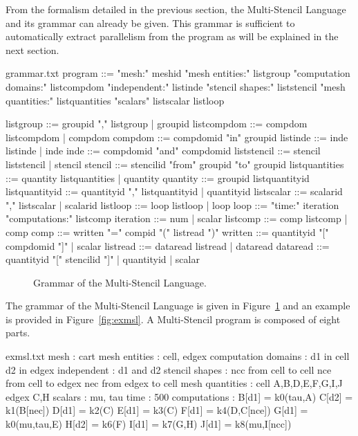From the formalism detailed in the previous section, the Multi-Stencil Language and its grammar can already be given.
This grammar is sufficient to automatically extract parallelism from the program as will be explained in the next section.

\begin{filecontents*}{grammar.txt}
program ::= "mesh:" meshid 
            "mesh entities:" listgroup
            "computation domains:" listcompdom
            "independent:" listinde
            "stencil shapes:" liststencil
            "mesh quantities:" listquantities
            "scalars" listscalar
            listloop

listgroup ::= groupid "," listgroup | groupid
listcompdom ::= compdom listcompdom | compdom
compdom ::= compdomid "in" groupid
listinde ::= inde listinde | inde
inde ::= compdomid "and" compdomid
liststencil ::= stencil liststencil | stencil
stencil ::= stencilid "from" groupid "to" groupid
listquantities ::= quantity listquantities |  quantity
quantity ::= groupid listquantityid
listquantityid ::= quantityid "," listquantityid |  quantityid
listscalar ::= scalarid "," listscalar | scalarid
listloop ::= loop listloop | loop
loop ::=  "time:" iteration
          "computations:" listcomp
iteration ::= num | scalar
listcomp ::= comp listcomp |  comp
comp ::= written "=" compid "(" listread ")"
written ::= quantityid "[" compdomid "]" | scalar
listread ::= dataread listread | dataread
dataread ::= quantityid "[" stencilid "]" |  quantityid | scalar
\end{filecontents*}

\begin{figure}[hbt]
  \hspace{5mm}
  \begin{minipage}[!h]{0.98\textwidth}
    {}   
    \caption{Grammar of the Multi-Stencil Language. \label{fig:grammar}}
  \end{minipage}
\end{figure}

The grammar of the Multi-Stencil Language is given in Figure~\ref{fig:grammar} and an example is provided in Figure~\ref{fig:exmsl}.
A Multi-Stencil program is composed of eight parts.

\begin{filecontents*}{exmsl.txt}
mesh : cart
mesh entities : cell, edgex
computation domains :
  d1 in cell
  d2 in edgex
independent :
  d1 and d2
stencil shapes : 
  ncc from cell to cell
  nce from cell to edgex
  nec from edgex to cell
mesh quantities :
  cell A,B,D,E,F,G,I,J
  edgex C,H
scalars : mu, tau
time : 500
computations :
  B[d1] = k0(tau,A)
  C[d2] = k1(B[nec])
  D[d1] = k2(C)
  E[d1] = k3(C)
  F[d1] = k4(D,C[nce])
  G[d1] = k0(mu,tau,E)
  H[d2] = k6(F)
  I[d1] = k7(G,H)
  J[d1] = k8(mu,I[ncc])
\end{filecontents*}

